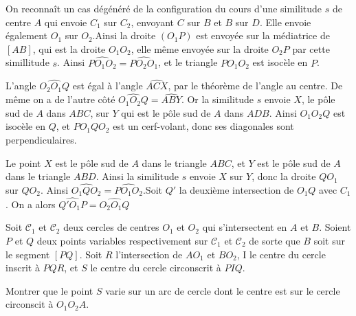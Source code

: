 \begin{sol}
On reconnaît un cas dégénéré de la configuration du cours d'une similitude $s$ de centre $A$ qui envoie $C_1$ sur $C_2$, envoyant $C$ sur $B$ et $B$ sur $D$. Elle envoie également $O_1$ sur $O_2$.Ainsi la droite $(O_1P)$ est envoyée sur la médiatrice de $[AB]$, qui est la droite $O_1O_2$, elle même envoyée sur la droite $O_2P$ par cette simillitude $s$. Ainsi $\widehat{PO_1O_2} = \widehat{PO_2O_1}$, et le triangle $PO_1O_2$ est isocèle en $P$.

\medskip

L'angle $\widehat{O_2O_1Q}$ est égal à l'angle $\widehat{ACX}$, par le théorème de l'angle au centre. De même on a de l'autre côté $\widehat{O_1O_2Q} = \widehat{ABY}$. Or la similitude $s$ envoie $X$, le pôle sud de $A$ dans $ABC$, sur $Y$ qui est le pôle sud de $A$ dans $ADB$. Ainsi $O_1O_2Q$ est isocèle en $Q$, et $PO_1QO_2$ est un cerf-volant, donc ses diagonales sont perpendiculaires.

\medskip

Le point $X$ est le pôle sud de $A$ dans le triangle $ABC$, et $Y$ est le pôle sud de $A$ dans le triangle $ABD$. Ainsi la similitude $s$ envoie $X$ sur $Y$, donc la droite $QO_1$ sur $QO_2$. Ainsi $\widehat{O_1QO_2} = \widehat{PO_1O_2}$.Soit $Q'$ la deuxième intersection de $O_1Q$ avec $C_1$. On a alors $\widehat{Q'O_1P} = \widehat{O_2O_1Q}$

\end{sol}

\begin{exo}
Soit $\mathcal{C}_1$ et $\mathcal{C}_2$ deux cercles de centres $O_1$ et $O_2$ qui s'intersectent en $A$ et $B$. Soient $P$ et $Q$ deux points variables respectivement sur $\mathcal{C}_1$ et $\mathcal{C}_2$ de sorte que $B$ soit sur le segment $[PQ]$. Soit $R$ l'intersection de $AO_1$ et $BO_2$, I le centre du cercle inscrit à $PQR$, et $S$ le centre du cercle circonscrit à $PIQ$.

Montrer que le point $S$ varie sur un arc de cercle dont le centre est sur le cercle circonscit à $O_1O_2A$. 
\end{exo}

